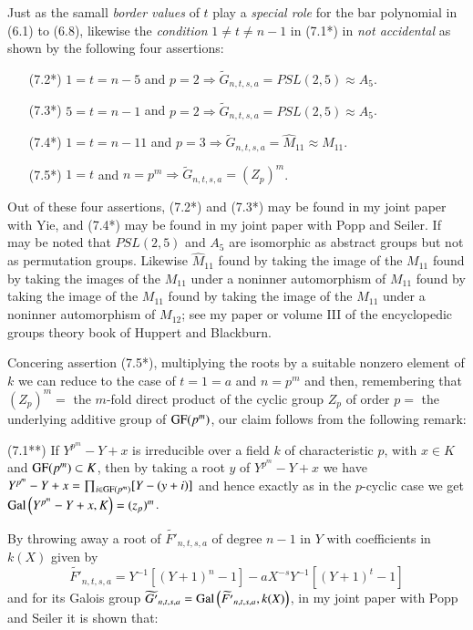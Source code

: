 Just as the samall \textit{border values} of $t$ play a \textit{special role} for the bar polynomial in (6.1) to (6.8), likewise the \textit{condition} $1\neq t \neq n-1$ in (7.1*) in \textit{not accidental} as shown by the following four assertions:
\begin{itemize}
\item[{\rm (7.2*)}] $1 =t =n-5$ and $ p=2\Rightarrow \widetilde{G}_{n,t,s,a} =PSL(2,5) \approx A_{5}$.
\item[{\rm (7.3*)}] $5=t=n-1$ and $ p=2\Rightarrow \widetilde{G}_{n,t,s,a} =PSL(2,5) \approx A_{5}$.
\item[{\rm (7.4*)}] $1=t=n-11$ and $p=3 \Rightarrow \widetilde{G}_{n,t,s,a} = \widehat{M}_{11}\approx M_{11}$.
\item[{\rm (7.5*)}] $1=t$ and $n=p^{m} \Rightarrow \widetilde{G}_{n,t,s,a} =(Z_{p})^m$. 
\end{itemize}

Out of these four assertions, (7.2*) and (7.3*) may be found in my joint paper \cite{art1-key17} with Yie, and (7.4*) may be found in my joint paper \cite{art1-key15} with Popp and Seiler. If may be noted that $PSL(2,5)$ and $A_{5}$ are isomorphic as abstract groups but not as permutation groups. Likewise $\widehat{M}_{11}$ found by taking the image of the $M_{11}$ found by taking the images of the $M_{11}$ under a noninner automorphism of $M_{11}$ found by taking the image of the $M_{11}$ found by taking the image of the $M_{11}$ under a noninner automorphism of $M_{12}$; see my paper \cite{art1-key8} or volume III of the encyclopedic groups theory book \cite{art1-key36} of Huppert and Blackburn. 

Concering assertion (7.5*), multiplying the roots by a suitable nonzero element of $k$ we can reduce to the case of $t=1=a$ and $n=p^{m}$ and then, remembering that $(Z_{p})^m =$ the $m$-fold direct product of the cyclic group $Z_{p}$ of order $p=$ the underlying additive group of $\operatorname{GF}(p^m)$, our claim follows from the following remark: 

(7.1**) If $Y^{p^{m}}-Y+x$ is irreducible over a field $k$ of characteristic $p$, with $x\in K$ and $\operatorname{GF}(p^m) \subset K$, then by taking a root $y$ of $Y^{p^{m}}-Y+x$ we have $Y^{p^{m}}-Y+x = \prod_{i\in \operatorname{GF}(p^m)}[Y-(y+i)]$ and hence exactly as in the $p$-cyclic case we get $\operatorname{Gal}\left(Y^{p^{m}}-Y +x, K\right) = (z_{p})^m$. 

By throwing away a root of $\widetilde{F'}_{n,t,s,a}$ of degree $n-1$ in $Y$ with coefficients in $k(X)$ given by
$$
\widetilde{F'}_{n,t,s,a} = Y^{-1}\left[(Y+1)^{n} -1\right]- aX^{-s}Y^{-1}\left[(Y+1)^{t}-1\right]
$$
and for its Galois group $\widetilde{G'}_{n,t,s,a} = \operatorname{Gal}\left(\widetilde{F'}_{n,t,s,a}, k(X)\right)$, in my joint paper \cite{art1-key15} with Popp and Seiler it is shown that:

